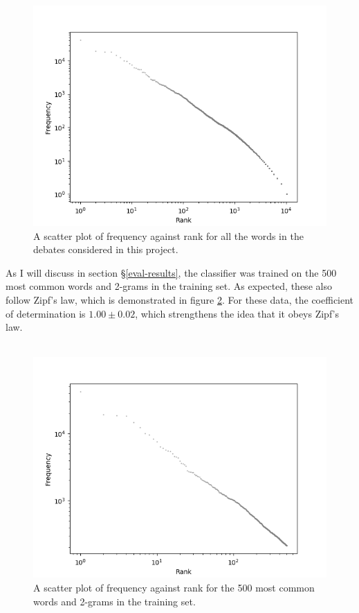 \documentclass[12pt,a4paper,twoside,openright]{report}
\begin{document}
\begin{figure}
	\begin{center}
		\includegraphics[scale=1]{figs/bigzipf.png}
	\end{center}
	\caption{A scatter plot of frequency against rank for all the words in the debates considered in this project.}
	\label{fig:bigzipf}
\end{figure}
As I will discuss in section \S\ref{eval-results}, the classifier was trained on the 500 most common words and 2-grams in the training set. As expected, these also follow Zipf's law, which is demonstrated in figure \ref{fig:zipf}. For these data, the coefficient of determination is $1.00 \pm 0.02$\footnotemark[\value{footnote}], which strengthens the idea that it obeys Zipf's law.
\\\\


\begin{figure}
	\begin{center}
		\includegraphics[scale=1]{figs/zipf.png}
	\end{center}
	\caption{A scatter plot of frequency against rank for the 500 most common words and 2-grams in the training set.}
	\label{fig:zipf}
\end{figure}
\end{document}
